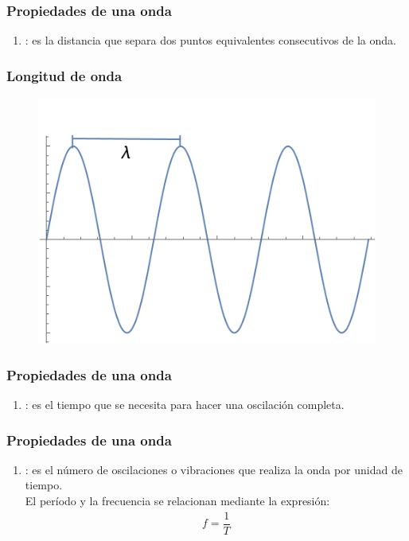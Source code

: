 \documentclass[14pt]{beamer}
\begin{document}
\begin{frame}
\frametitle{Propiedades de una onda}
\begin{enumerate}[<+->]
\conti
\item {}: es la distancia que separa dos puntos equivalentes consecutivos de la onda.
\seti
\end{enumerate}
\end{frame}
\begin{frame}
\frametitle{Longitud de onda}
\begin{figure}
    \centering
    \includegraphics[scale=0.8]{Imagenes/Plot_Onda_07.png}
\end{figure}
\end{frame}
\begin{frame}
\frametitle{Propiedades de una onda}
\begin{enumerate}[<+->]
\conti
\item {}: es el tiempo que se necesita para hacer una oscilación completa.
\seti
\end{enumerate}
\end{frame}
\begin{frame}
\frametitle{Propiedades de una onda}
\begin{enumerate}[<+->]
\conti
\item {}: es el número de oscilaciones o vibraciones que realiza la onda por unidad de tiempo.
\\
\bigskip
El período y la frecuencia se relacionan mediante la expresión:
\pause
\begin{align*}
f = \dfrac{1}{T}
\end{align*}
\seti
\end{enumerate}
\end{frame}
\end{document}
